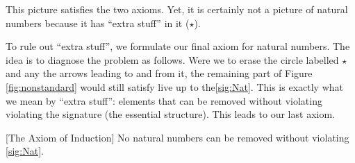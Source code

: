 This picture satisfies the two axioms. Yet, it is certainly not a picture of natural numbers because it
has ``extra stuff'' in it ($\star$).
\ipadbreak

To rule out ``extra stuff'', we formulate
our final axiom for natural numbers.  The idea is to diagnose the problem as follows. Were we to erase
the circle labelled $\star$ and any the arrows leading to and from it, the remaining part of
Figure \ref{fig:nonstandard} would still
satisfy live up to the\ref{sig:Nat}. This is exactly what we
mean by ``extra stuff'': elements
that can be removed without violating violating the signature (the essential structure). 
This leads to our last axiom. 

\begin{axiom}\label{ax:NatInd}
[The Axiom of Induction] No natural numbers can be removed without violating \ref{sig:Nat}.
\end{axiom}


